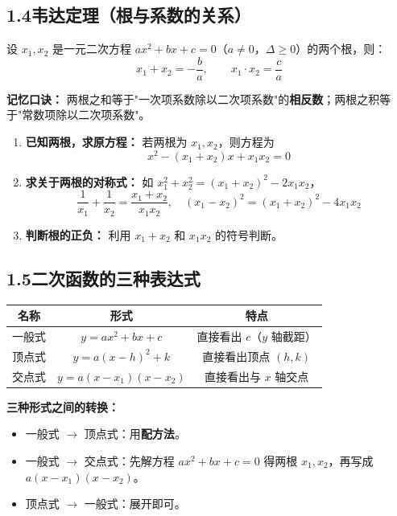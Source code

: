 \documentclass[12pt, a4paper]{ctexart}
\begin{document}
\subsection*{1.4\quad 韦达定理（根与系数的关系）}

\begin{knowledgebox}[韦达定理]
设 $x_1, x_2$ 是一元二次方程 $ax^2 + bx + c = 0$（$a \neq 0$，$\Delta \geq 0$）的两个根，则：
\[
\boxed{x_1 + x_2 = -\frac{b}{a}}, \qquad \boxed{x_1 \cdot x_2 = \frac{c}{a}}
\]

\textbf{记忆口诀：} 两根之和等于"一次项系数除以二次项系数"的\textbf{相反数}；两根之积等于"常数项除以二次项系数"。
\end{knowledgebox}

\begin{tipbox}[韦达定理的常见应用]
\begin{enumerate}[leftmargin=2em]
  \item \textbf{已知两根，求原方程：} 若两根为 $x_1, x_2$，则方程为
  \[
  x^2 - (x_1 + x_2)x + x_1 x_2 = 0
  \]
  \item \textbf{求关于两根的对称式：} 如 $x_1^2 + x_2^2 = (x_1+x_2)^2 - 2x_1 x_2$，
  \[
  \frac{1}{x_1} + \frac{1}{x_2} = \frac{x_1 + x_2}{x_1 x_2}, \quad
  (x_1 - x_2)^2 = (x_1+x_2)^2 - 4x_1 x_2
  \]
  \item \textbf{判断根的正负：} 利用 $x_1 + x_2$ 和 $x_1 x_2$ 的符号判断。
\end{enumerate}
\end{tipbox}

\subsection*{1.5\quad 二次函数的三种表达式}

\begin{knowledgebox}[三种表达式对比]
\begin{center}
\renewcommand{\arraystretch}{1.8}
\begin{tabular}{|c|c|c|}
\hline
\textbf{名称} & \textbf{形式} & \textbf{特点} \\
\hline
一般式 & $y = ax^2 + bx + c$ & 直接看出 $c$（$y$ 轴截距） \\
\hline
顶点式 & $y = a(x - h)^2 + k$ & 直接看出顶点 $(h, k)$ \\
\hline
交点式 & $y = a(x - x_1)(x - x_2)$ & 直接看出与 $x$ 轴交点 \\
\hline
\end{tabular}
\end{center}

\textbf{三种形式之间的转换：}
\begin{itemize}[leftmargin=2em]
  \item 一般式 $\to$ 顶点式：用\textbf{配方法}。
  \item 一般式 $\to$ 交点式：先解方程 $ax^2+bx+c=0$ 得两根 $x_1, x_2$，再写成 $a(x-x_1)(x-x_2)$。
  \item 顶点式 $\to$ 一般式：展开即可。
\end{itemize}
\end{knowledgebox}
\end{document}
